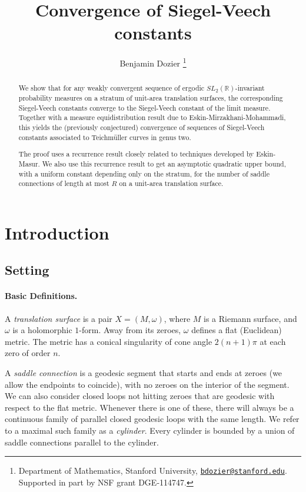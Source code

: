 \documentclass{article}
\title{Convergence of Siegel-Veech constants}
\author{Benjamin Dozier \thanks{Department of Mathematics, Stanford University, \href{mailto:bdozier@stanford.edu}{\nolinkurl{bdozier@stanford.edu}}.  Supported in part by  NSF grant DGE-114747.}}
\date{}
\theoremstyle{definition}
\begin{document}
\maketitle

\begin{abstract}
  We show that for any weakly convergent sequence of ergodic $SL_2(\mathbb{R})$-invariant probability measures on a stratum of unit-area translation surfaces, the corresponding Siegel-Veech constants converge to the Siegel-Veech constant of the limit measure.  Together with a measure equidistribution result due to Eskin-Mirzakhani-Mohammadi, this yields the (previously conjectured) convergence of sequences of Siegel-Veech constants associated to Teichm\"uller curves in genus two.  

The proof uses a recurrence result closely related to techniques developed by Eskin-Masur.  We also use this recurrence result to get an asymptotic quadratic upper bound, with a uniform constant depending only on the stratum, for the number of saddle connections of length at most $R$ on a unit-area translation surface.  
 
\end{abstract}

\section{Introduction}
\label{sec:intro}
\subsection{Setting}

\paragraph{Basic Definitions.} A \emph{translation surface} is a pair $X=(M,\omega)$, where $M$ is a Riemann surface, and $\omega$ is a holomorphic $1$-form.  Away from its zeroes, $\omega$ defines a flat (Euclidean) metric. The metric has a conical singularity of cone angle $2(n+1)\pi$ at each zero of order $n$.  

A \emph{saddle connection} is a geodesic segment that starts and ends at zeroes (we allow the endpoints to coincide), with no zeroes on the interior of the segment.  We can also consider closed loops not hitting zeroes that are geodesic with respect to the flat metric.  Whenever there is one of these, there will always be a continuous family of parallel closed geodesic loops with the same length.  We refer to a maximal such family as a \emph{cylinder}.  Every cylinder is bounded by a union of saddle connections parallel to the cylinder.  
\end{document}
